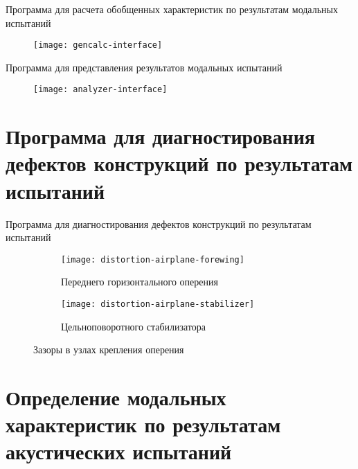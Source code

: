 \begin{frame}{Программа для расчета обобщенных характеристик по результатам модальных испытаний}
	\begin{figure}
		\centering
		\texttt{[image: gencalc-interface]}
	\end{figure}
\end{frame}

\begin{frame}{Программа для представления результатов модальных испытаний}
	\begin{figure}
		\centering
		\texttt{[image: analyzer-interface]}
	\end{figure}
\end{frame}

\section{Программа для диагностирования дефектов конструкций по результатам испытаний}

\begin{frame}{Программа для диагностирования дефектов конструкций по результатам испытаний}
	\begin{figure}
		\centering
		\begin{subfigure}[t]{0.49\textwidth}
			\texttt{[image: distortion-airplane-forewing]}
			\caption{Переднего горизонтального оперения}
		\end{subfigure}
		\hfill
		\begin{subfigure}[t]{0.49\textwidth}
			\texttt{[image: distortion-airplane-stabilizer]} 
			\caption{Цельноповоротного стабилизатора}
		\end{subfigure}
    	\caption{Зазоры в узлах крепления оперения} 
	\end{figure}
\end{frame}

\section{Определение модальных характеристик по результатам акустических испытаний}

